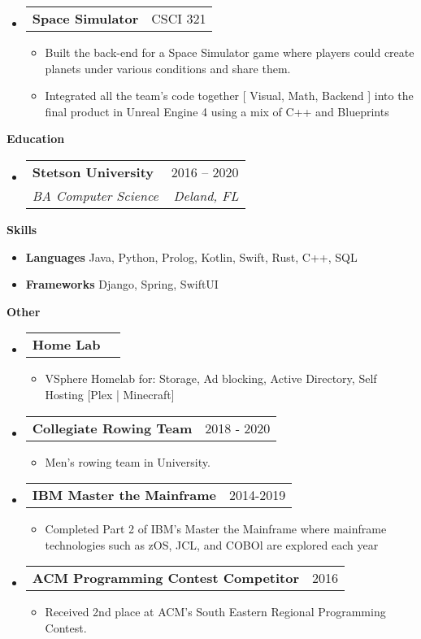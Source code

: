\documentclass[letterpaper,12pt]{article}[leftmargin=*]
\makeatletter
\def \entryspacing {-0pt}
\renewcommand{\section}[2]{\vspace{5pt}
  \colorbox{secondary}{\color{white}\raggedbottom\normalsize\textbf{{#1}{\hspace{7pt}#2}}}
}
\newcommand{\resumeEntryStart}{\begin{itemize}[leftmargin=2.5mm]}
\newcommand{\resumeEntryEnd}{\end{itemize}\vspace{\entryspacing}}
\newcommand{\resumeItemListStart}{\begin{itemize}[leftmargin=4.5mm]}
\newcommand{\resumeItemListEnd}{\end{itemize}}
\newcommand{\resumeItem}[1]{
  \item\small{
    {#1 \vspace{-2pt}}
  }
}
\newcommand{\resumeEntryTSDL}[4]{
  \vspace{-1pt}\item[]
    \begin{tabularx}{0.97\textwidth}{X@{\hspace{60pt}}r}
      \textbf{\color{primary}#1} & {\firabook\color{accent}\small#2} \\
      \textit{\color{accent}\small#3} & \textit{\color{accent}\small#4} \\
    \end{tabularx}\vspace{-6pt}
}
\newcommand{\resumeEntryTD}[2]{
  \vspace{-1pt}\item[]
    \begin{tabularx}{0.97\textwidth}{X@{\hspace{60pt}}r}
      \textbf{\color{primary}#1} & {\firabook\color{accent}\small#2} \\
    \end{tabularx}\vspace{-6pt}
}
\newcommand{\resumeEntryS}[2]{
  \item[]\small{
    \textbf{\color{primary}#1 }{ #2 \vspace{-6pt}}
  }
}
\makeatother
\begin{document}
  \resumeEntryStart
    \resumeEntryTD
      {Space Simulator}{CSCI 321}
    \resumeItemListStart
    \resumeItem {Built the back-end for a Space Simulator game where players
    could create planets under various conditions and share them.}
      \resumeItem {Integrated all the team's code together [ Visual, Math, Backend ] into the final product in Unreal Engine 4 using a mix of C++ and Blueprints}
    \resumeItemListEnd
  \resumeEntryEnd

\section{\faGraduationCap}{Education}

  \resumeEntryStart
    \resumeEntryTSDL
      {Stetson University}{2016 -- 2020}
      {BA Computer Science}{Deland, FL}
  \resumeEntryEnd

\section{\faGears}{Skills}
 \resumeEntryStart
  \resumeEntryS{Languages } {Java, Python, Prolog, Kotlin, Swift, Rust, C++, SQL}
  \resumeEntryS{Frameworks } {Django, Spring, SwiftUI}
 \resumeEntryEnd
 
 \section{\faGears}{Other}
 \resumeEntryStart
    \resumeEntryTD
      {Home Lab}{}
    \resumeItemListStart
    \resumeItem {VSphere Homelab for: Storage, Ad blocking, Active Directory,
    Self Hosting [Plex | Minecraft]}
    \resumeItemListEnd
  \resumeEntryEnd
 \resumeEntryStart
    \resumeEntryTD
      {Collegiate Rowing Team}{2018 - 2020}
    \resumeItemListStart
      \resumeItem {Men's rowing team in University.}
    \resumeItemListEnd
  \resumeEntryEnd
   \resumeEntryStart
    \resumeEntryTD
      {IBM Master the Mainframe}{2014-2019}
    \resumeItemListStart
    \resumeItem {Completed Part 2 of IBM's Master the Mainframe where mainframe
    technologies such as zOS, JCL, and COBOl are explored each year}
    \resumeItemListEnd
  \resumeEntryEnd
  \resumeEntryStart
    \resumeEntryTD
      {ACM Programming Contest Competitor}{2016}
    \resumeItemListStart
      \resumeItem {Received 2nd place at ACM's South Eastern Regional Programming Contest.}
    \resumeItemListEnd
  \resumeEntryEnd
\end{document}
